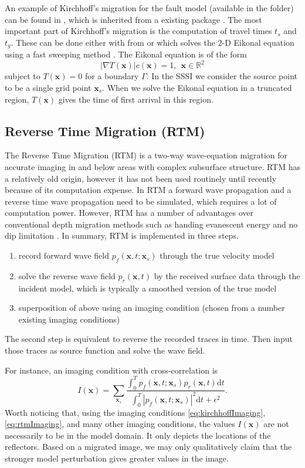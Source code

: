 \documentclass[11pt]{article}
\newcommand{\real}{\mathbb{R}}
\newcommand{\bx}{\boldsymbol{x}}
\theoremstyle{plain}
\theoremstyle{definition}
\theoremstyle{remark}
\numberwithin{equation}{section}
\begin{document}
An example of Kirchhoff's migration for the fault model (available in the  folder) can 
be found in , which is 
inherited from a existing package \cite{Kozola:2011aa}.
The most important part of Kirchhoff's migration is the computation of travel times $t_s$ and $t_g$.   
These can be done either with  from \cite{Kozola:2011aa} or
 which solves the 2-D Eikonal equation using a fast sweeping method \cite{Zhao:2004aa}.
The Eikonal equation is of the form
\begin{equation}
|\nabla T(\bx)| c(\bx)= 1, ~~\bx\in \real^2
\end{equation}
subject to $T(\bx) = 0$ for a boundary $\Gamma$. In the SSSI we consider the source point to be a single 
grid point $\bx_s$. When we solve the Eikonal equation in a truncated region, $T(\bx)$ gives the time of 
first arrival in this region. 


\subsection{Reverse Time Migration (RTM)}
The Reverse Time Migration (RTM) is a two-way wave-equation migration for accurate imaging in and below areas with complex subsurface 
structure. RTM has a relatively old origin, however it has not been used routinely until recently because of its
computation expense. In RTM a forward wave propagation and a reverse time wave propagation need to be 
simulated, which requires a lot of computation power. However, RTM has a number of advantages over conventional depth migration methods such as 
handing evanescent energy and no dip limitation \cite{McMechan:1983aa, Baysal:1983aa}. In summary, RTM is implemented in three steps. 
\begin{enumerate}
\item record forward wave field $p_f(\bx, t; \bx_s)$ through the true velocity model
\item solve the reverse wave field $p_r(\bx, t)$ by the received surface data through the incident model, which is typically a smoothed version of the true model
\item superposition of above using an imaging condition (chosen from a number existing imaging conditions)
\end{enumerate}
The second step is equivalent to reverse the recorded traces in time. Then input those traces as source function and solve the wave field. 

For instance, an imaging condition with cross-correlation is 
\begin{equation}
\label{eq:rtmImaging}
I(\bx) = \sum_{\bx_s} \frac{\int_0^T p_f(\bx, t; \bx_s)p_r(\bx, t)\mathrm{d}t}{\int_0^T |p_f(\bx, t; \bx_s)|^2\mathrm{d}t + \epsilon^2}.
\end{equation}
Worth noticing that, using the imaging conditions \eqref{eq:kirchhoffImaging}, \eqref{eq:rtmImaging}, and many other imaging conditions, the values $I(\bx)$ are not necessarily to be in the model domain. It only depicts the locations of the reflectors. Based on a migrated image, we may only qualitatively claim that the stronger model perturbation gives greater values in the image. 
\end{document}
